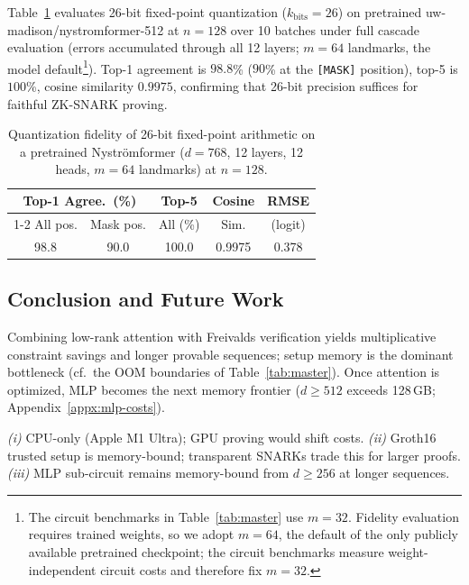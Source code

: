 \documentclass[runningheads]{llncs}
\begin{document}
\label{subsec:quantization-fidelity}
Table~\ref{tab:quantization} evaluates 26-bit fixed-point quantization ($k_\text{bits}{=}26$) on pretrained uw-madison/nystromformer-512 at $n{=}128$ over 10 batches under full cascade evaluation (errors accumulated through all 12 layers; $m{=}64$ landmarks, the model default\footnote{The circuit benchmarks in Table~\ref{tab:master} use $m{=}32$. Fidelity evaluation requires trained weights, so we adopt $m{=}64$, the default of the only publicly available pretrained checkpoint; the circuit benchmarks measure weight-independent circuit costs and therefore fix $m{=}32$.}). Top-1 agreement is $98.8$\% ($90$\% at the \texttt{[MASK]} position), top-5 is $100$\%, cosine similarity $0.9975$, confirming that 26-bit precision suffices for faithful ZK-SNARK proving.

\begin{table}[H]
\centering
\caption{Quantization fidelity of 26-bit fixed-point arithmetic on a pretrained Nystr\"omformer ($d{=}768$, 12 layers, 12 heads, $m{=}64$ landmarks) at $n{=}128$.}
\label{tab:quantization}
\footnotesize
\setlength{\tabcolsep}{4pt}
\begin{tabular}{@{} ccc cc @{}}
\toprule
\multicolumn{2}{c}{Top-1 Agree.\ (\%)} & Top-5 & Cosine & RMSE \\
\cmidrule(lr){1-2}
All pos. & Mask pos. & All (\%) & Sim. & (logit) \\
\midrule
98.8 & 90.0 & 100.0 & 0.9975 & 0.378 \\
\bottomrule
\end{tabular}
\end{table}


\subsection{Conclusion and Future Work}
\label{subsec:discussion}
Combining \nystrom low-rank attention with Freivalds verification yields multiplicative constraint savings and longer provable sequences; setup memory is the dominant bottleneck (cf.\ the OOM boundaries of Table~\ref{tab:master}). Once attention is optimized, MLP becomes the next memory frontier ($d{\geq}512$ exceeds 128\,GB; Appendix~\ref{appx:mlp-costs}).

\emph{(i)} CPU-only (Apple M1 Ultra); GPU proving would shift costs.
\emph{(ii)} Groth16 trusted setup is memory-bound; transparent SNARKs trade this for larger proofs.
\emph{(iii)} MLP sub-circuit remains memory-bound from $d{\geq}256$ at longer sequences.
\end{document}
